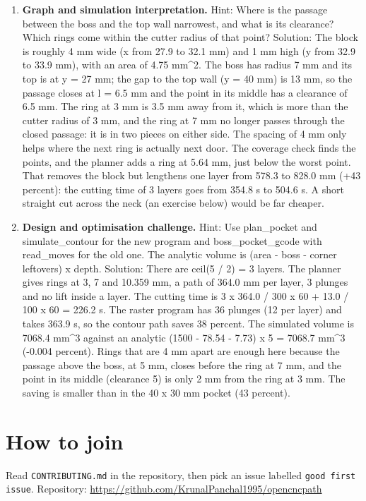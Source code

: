 \documentclass[11pt,a4paper]{article}
\begin{document}
\begin{enumerate}[nosep]
\item \textbf{Graph and simulation interpretation.} Hint: Where is the passage between the boss and the top wall narrowest, and what is its clearance? Which rings come within the cutter radius of that point? Solution: The block is roughly 4 mm wide (x from 27.9 to 32.1 mm) and 1 mm high (y from 32.9 to 33.9 mm), with an area of 4.75 mm\textasciicircum{}2. The boss has radius 7 mm and its top is at y = 27 mm; the gap to the top wall (y = 40 mm) is 13 mm, so the passage closes at l = 6.5 mm and the point in its middle has a clearance of 6.5 mm. The ring at 3 mm is 3.5 mm away from it, which is more than the cutter radius of 3 mm, and the ring at 7 mm no longer passes through the closed passage: it is in two pieces on either side. The spacing of 4 mm only helps where the next ring is actually next door. The coverage check finds the points, and the planner adds a ring at 5.64 mm, just below the worst point. That removes the block but lengthens one layer from 578.3 to 828.0 mm (+43 percent): the cutting time of 3 layers goes from 354.8 s to 504.6 s. A short straight cut across the neck (an exercise below) would be far cheaper.
\item \textbf{Design and optimisation challenge.} Hint: Use plan\_pocket and simulate\_contour for the new program and boss\_pocket\_gcode with read\_moves for the old one. The analytic volume is (area - boss - corner leftovers) x depth. Solution: There are ceil(5 / 2) = 3 layers. The planner gives rings at 3, 7 and 10.359 mm, a path of 364.0 mm per layer, 3 plunges and no lift inside a layer. The cutting time is 3 x 364.0 / 300 x 60 + 13.0 / 100 x 60 = 226.2 s. The raster program has 36 plunges (12 per layer) and takes 363.9 s, so the contour path saves 38 percent. The simulated volume is 7068.4 mm\textasciicircum{}3 against an analytic (1500 - 78.54 - 7.73) x 5 = 7068.7 mm\textasciicircum{}3 (-0.004 percent). Rings that are 4 mm apart are enough here because the passage above the boss, at 5 mm, closes before the ring at 7 mm, and the point in its middle (clearance 5) is only 2 mm from the ring at 3 mm. The saving is smaller than in the 40 x 30 mm pocket (43 percent).
\end{enumerate}

\section{How to join}
Read \texttt{CONTRIBUTING.md} in the repository, then pick an issue labelled \texttt{good first issue}. Repository: \url{https://github.com/KrunalPanchal1995/opencncpath}
\end{document}
